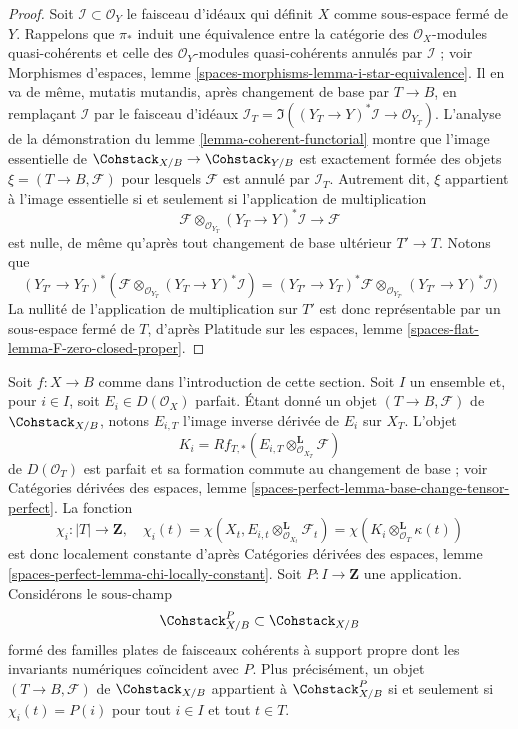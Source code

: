 \begin{proof}
Soit $\mathcal{I} \subset \mathcal{O}_Y$ le faisceau d'idéaux qui définit
$X$ comme sous-espace fermé de $Y$. Rappelons que $\pi_*$ induit une
équivalence entre la catégorie des $\mathcal{O}_X$-modules quasi-cohérents
et celle des $\mathcal{O}_Y$-modules quasi-cohérents annulés par
$\mathcal{I}$ ; voir Morphismes d'espaces, lemme
\ref{spaces-morphisms-lemma-i-star-equivalence}.
Il en va de même, mutatis mutandis, après changement de base par
$T \to B$, en remplaçant $\mathcal{I}$ par le faisceau d'idéaux
$\mathcal{I}_T = \Im((Y_T \to Y)^*\mathcal{I} \to \mathcal{O}_{Y_T})$.
L'analyse de la démonstration du lemme
\ref{lemma-coherent-functorial} montre que l'image essentielle de
$\Cohstack_{X/B} \to \Cohstack_{Y/B}$
est exactement formée des objets $\xi = (T \to B, \mathcal{F})$ pour
lesquels $\mathcal{F}$ est annulé par $\mathcal{I}_T$.
Autrement dit, $\xi$ appartient à l'image essentielle si et seulement si
l'application de multiplication
$$
\mathcal{F} \otimes_{\mathcal{O}_{Y_T}} (Y_T \to Y)^*\mathcal{I}
\longrightarrow
\mathcal{F}
$$
est nulle, de même qu'après tout changement de base ultérieur
$T' \to T$.
Notons que
$$
(Y_{T'} \to Y_T)^*(
\mathcal{F} \otimes_{\mathcal{O}_{Y_T}} (Y_T \to Y)^*\mathcal{I}) =
(Y_{T'} \to Y_T)^*\mathcal{F} \otimes_{\mathcal{O}_{Y_{T'}}}
(Y_{T'} \to Y)^*\mathcal{I})
$$
La nullité de l'application de multiplication sur $T'$ est donc
représentable par un sous-espace fermé de $T$, d'après Platitude sur les
espaces, lemme \ref{spaces-flat-lemma-F-zero-closed-proper}.
\end{proof}

\begin{situation}
\label{situation-numerical}
Soit $f : X \to B$ comme dans l'introduction de cette section. Soit $I$
un ensemble et, pour $i \in I$, soit $E_i \in D(\mathcal{O}_X)$ parfait.
Étant donné un objet $(T \to B, \mathcal{F})$ de $\Cohstack_{X/B}$,
notons $E_{i, T}$ l'image inverse dérivée de $E_i$ sur $X_T$.
L'objet
$$
K_i = Rf_{T, *}(E_{i, T} \otimes_{\mathcal{O}_{X_T}}^\mathbf{L} \mathcal{F})
$$
de $D(\mathcal{O}_T)$ est parfait et sa formation commute au changement de
base ; voir Catégories dérivées des espaces, lemme
\ref{spaces-perfect-lemma-base-change-tensor-perfect}.
La fonction
$$
\chi_i : |T| \longrightarrow \mathbf{Z},\quad
\chi_i(t) =
\chi(X_t, E_{i, t} \otimes_{\mathcal{O}_{X_t}}^\mathbf{L} \mathcal{F}_t) =
\chi(K_i \otimes_{\mathcal{O}_T}^\mathbf{L} \kappa(t))
$$
est donc localement constante d'après Catégories dérivées des espaces,
lemme \ref{spaces-perfect-lemma-chi-locally-constant}.
Soit $P : I \to \mathbf{Z}$ une application. Considérons le sous-champ
$$
\Cohstack^P_{X/B} \subset \Cohstack_{X/B}
$$
formé des familles plates de faisceaux cohérents à support propre dont les
invariants numériques coïncident avec $P$. Plus précisément, un objet
$(T \to B, \mathcal{F})$ de $\Cohstack_{X/B}$ appartient à
$\Cohstack^P_{X/B}$ si et seulement si $\chi_i(t) = P(i)$ pour tout
$i \in I$ et tout $t \in T$.
\end{situation}

